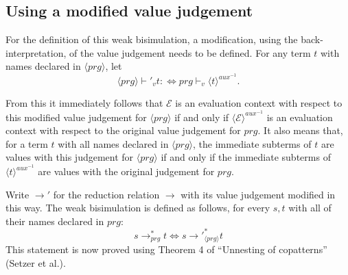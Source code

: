 \subsection{Using a modified value judgement}

For the definition of this weak bisimulation, a modification, using the back-interpretation, of the value judgement needs to be defined. For any term $t$ with names declared in $\langle prg \rangle$, let
\[
\langle prg \rangle \vdash'_v t :\iff prg \vdash_v \langle t \rangle^{aux^{-1}}.
\]

From this it immediately follows that $\mathcal{E}$ is an evaluation context with respect to this modified value judgement for $\langle prg \rangle$ if and only if $\langle \mathcal{E} \rangle^{aux^{-1}}$ is an evaluation context with respect to the original value judgement for $prg$. It also means that, for a term $t$ with all names declared in $\langle prg \rangle$, the immediate subterms of $t$ are values with this judgement for $\langle prg \rangle$ if and only if the immediate subterms of $\langle t \rangle^{aux^{-1}}$ are values with the original judgement for $prg$.

Write $\longrightarrow'$ for the reduction relation $\longrightarrow$ with its value judgement modified in this way. The weak bisimulation is defined as follows, for every $s,t$ with all of their names declared in $prg$:
\begin{equation}
s \longrightarrow_{prg}^* t \iff s {\longrightarrow'}_{\langle prg \rangle}^* t
\end{equation}
This statement is now proved using Theorem 4 of ``Unnesting of copatterns'' (Setzer et al.).

